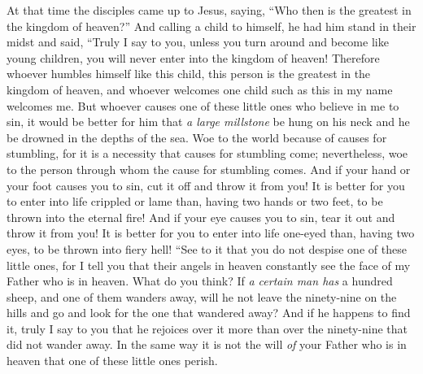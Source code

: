 \begin{biblechapter} %
 At that time the disciples came up to Jesus, saying, “Who then is the greatest in the kingdom of heaven?”
\verse And calling a child to himself, he had him stand in their midst
\verse and said, “Truly I say to you, unless you turn around and become like young children, you will never enter into the kingdom of heaven!
\verse Therefore whoever humbles himself like this child, this person is the greatest in the kingdom of heaven,
\verse and whoever welcomes one child such as this in my name welcomes me.
\verse But whoever causes one of these little ones who believe in me to sin, it would be better for him that \textit{a large millstone} be hung on his neck and he be drowned in the depths of the sea.
\verse Woe to the world because of causes for stumbling, for it is a necessity that causes for stumbling come; nevertheless, woe to the person through whom the cause for stumbling comes.
\verse And if your hand or your foot causes you to sin, cut it off and throw it from you! It is better for you to enter into life crippled or lame than, having two hands or two feet, to be thrown into the eternal fire!
\verse And if your eye causes you to sin, tear it out and throw it from you! It is better for you to enter into life one-eyed than, having two eyes, to be thrown into fiery hell!
 “See to it that you do not despise one of these little ones, for I tell you that their angels in heaven constantly see the face of my Father who is in heaven.
\verse What do you think? If \textit{a certain man has} a hundred sheep, and one of them wanders away, will he not leave the ninety-nine on the hills and go and look for the one that wandered away?
\verse And if he happens to find it, truly I say to you that he rejoices over it more than over the ninety-nine that did not wander away.
\verse In the same way it is not the will \textit{of} your Father who is in heaven that one of these little ones perish.

\end{biblechapter}
